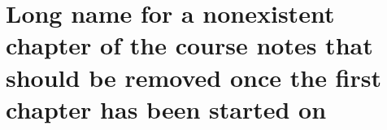 \section[Some chapter]{Long name for a nonexistent chapter of the course notes that should be removed once the first chapter has been started on}